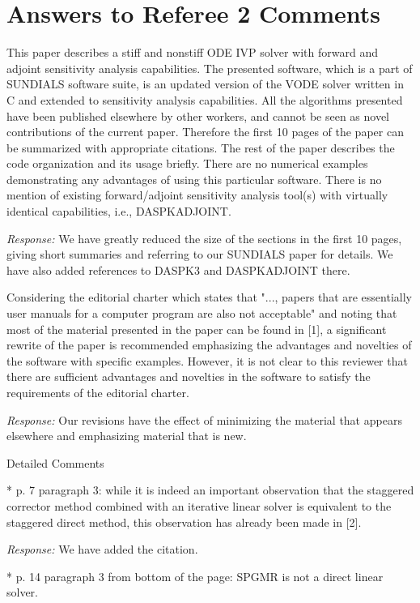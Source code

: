 \newpage
\section{Answers to Referee 2 Comments}

This paper describes a stiff and nonstiff ODE IVP solver with forward
and adjoint sensitivity analysis capabilities. The presented software,
which is a part of SUNDIALS software suite, is an updated version of
the VODE solver written in C and extended to sensitivity analysis
capabilities.  All the algorithms presented have been published
elsewhere by other workers, and cannot be seen as novel contributions
of the current paper. Therefore the first 10 pages of the paper can be
summarized with appropriate citations. The rest of the paper describes
the code organization and its usage briefly. There are no numerical
examples demonstrating any advantages of using this particular
software. There is no mention of existing forward/adjoint sensitivity
analysis tool(s) with virtually identical capabilities, i.e.,
DASPKADJOINT.

{\em Response:}
We have greatly reduced the size of the sections in the first 10
pages, giving short summaries and referring to our SUNDIALS paper for
details.  We have also added references to DASPK3 and DASPKADJOINT
there.

Considering the editorial charter which states that "..., papers that
are essentially user manuals for a computer program are also not
acceptable" and noting that most of the material presented in the
paper can be found in [1], a significant rewrite of the paper is
recommended emphasizing the advantages and novelties of the software
with specific examples. However, it is not clear to this reviewer that
there are sufficient advantages and novelties in the software to
satisfy the requirements of the editorial charter.

{\em Response:} 
Our revisions have the effect of minimizing the material that appears
elsewhere and emphasizing material that is new.

Detailed Comments

* p. 7 paragraph 3: while it is indeed an important observation that
the staggered corrector method combined with an iterative linear
solver is equivalent to the staggered direct method, this observation
has already been made in [2].

{\em Response:}
We have added the citation.

* p. 14 paragraph 3 from bottom of the page: SPGMR is not a direct
linear solver.

